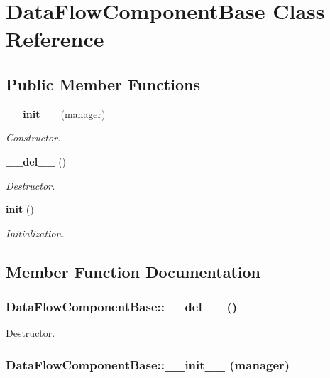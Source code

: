 \section{Data\-Flow\-Component\-Base Class Reference}
\label{classDataFlowComponentBase}
\subsection*{Public Member Functions}
\begin{CompactItemize}
\item 
{\bf \_\-\_\-init\_\-\_\-} (manager)
\begin{CompactList}\small\item\em Constructor. \item\end{CompactList}\item 
{\bf \_\-\_\-del\_\-\_\-} ()
\begin{CompactList}\small\item\em Destructor. \item\end{CompactList}\item 
{\bf init} ()
\begin{CompactList}\small\item\em Initialization. \item\end{CompactList}\end{CompactItemize}


\subsection{Member Function Documentation}
\subsubsection{\setlength{\rightskip}{0pt plus 5cm}Data\-Flow\-Component\-Base::\_\-\_\-del\_\-\_\- ()}\label{classDataFlowComponentBase_DataFlowComponentBasea1}


Destructor. 

\subsubsection{\setlength{\rightskip}{0pt plus 5cm}Data\-Flow\-Component\-Base::\_\-\_\-init\_\-\_\- (manager)}\label{classDataFlowComponentBase_DataFlowComponentBasea0}



